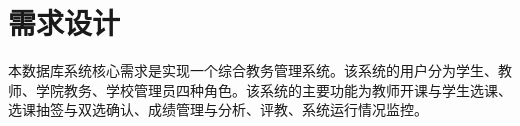 \section{需求设计}

\ttfamily 本数据库系统核心需求是实现一个{\sffamily 综合教务管理系统}。该系统的用户分为学生、教师、学院教务、学校管理员四种角色。该系统的主要功能为教师开课与学生选课、选课抽签与双选确认、成绩管理与分析、评教、系统运行情况监控。

\normalfont




